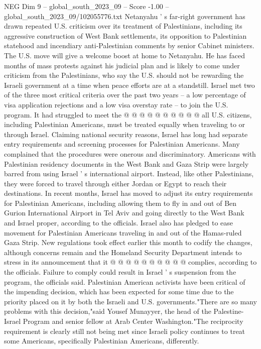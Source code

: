 \begin{textsample}{NEG Dim 9 – global\_south\_2023\_09 – Score -1.00 – global\_south\_2023\_09/102055776.txt}
Netanyahu ' s far-right government has drawn repeated U.S. criticism over its treatment of Palestinians, including its aggressive construction of West Bank settlements, its opposition to Palestinian statehood and incendiary anti-Palestinian comments by senior Cabinet ministers.
The U.S. move will give a welcome boost at home to Netanyahu.
He has faced months of mass protests against his judicial plan and is likely to come under criticism from the Palestinians, who say the U.S. should not be rewarding the Israeli government at a time when peace efforts are at a standstill.
Israel met two of the three most critical criteria over the past two years -- a low percentage of visa application rejections and a low visa overstay rate -- to join the U.S. program.
It had struggled to meet the @ @ @ @ @ @ @ @ @ @ all U.S. citizens, including Palestinian Americans, must be treated equally when traveling to or through Israel.
Claiming national security reasons, Israel has long had separate entry requirements and screening processes for Palestinian Americans.
Many complained that the procedures were onerous and discriminatory.
Americans with Palestinian residency documents in the West Bank and Gaza Strip were largely barred from using Israel ' s international airport.
Instead, like other Palestinians, they were forced to travel through either Jordan or Egypt to reach their destinations.
In recent months, Israel has moved to adjust its entry requirements for Palestinian Americans, including allowing them to fly in and out of Ben Gurion International Airport in Tel Aviv and going directly to the West Bank and Israel proper, according to the officials.
Israel also has pledged to ease movement for Palestinian Americans traveling in and out of the Hamas-ruled Gaza Strip.
New regulations took effect earlier this month to codify the changes, although concerns remain and the Homeland Security Department intends to stress in its announcement that it @ @ @ @ @ @ @ @ @ @ complies, according to the officials.
Failure to comply could result in Israel ' s suspension from the program, the officials said.
Palestinian American activists have been critical of the impending decision, which has been expected for some time due to the priority placed on it by both the Israeli and U.S. governments."There are so many problems with this decision,"said Yousef Munayyer, the head of the Palestine-Israel Program and senior fellow at Arab Center Washington."The reciprocity requirement is clearly still not being met since Israeli policy continues to treat some Americans, specifically Palestinian Americans, differently.

\end{textsample}
